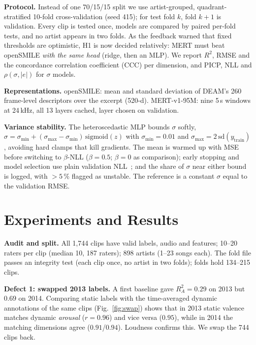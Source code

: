 \documentclass[conference]{IEEEtran}
\newcommand{\R}{R^2}
\begin{document}
\textbf{Protocol.} Instead of one 70/15/15 split we use artist-grouped,
quadrant-stratified 10-fold cross-validation (seed 415); for test fold $k$,
fold $k{+}1$ is validation. Every clip is tested once, models are compared by
paired per-fold tests, and no artist appears in two folds. As the feedback
warned that fixed thresholds are optimistic, H1 is now decided relatively:
MERT must beat openSMILE \emph{with the same head} (ridge, then an MLP). We
report $\R$, RMSE and the concordance correlation coefficient (CCC) per
dimension, and PICP, NLL and $\rho(\sigma,|e|)$ for $\sigma$ models.

\textbf{Representations.} openSMILE: mean and standard deviation of DEAM's 260
frame-level descriptors over the excerpt (520-d). MERT-v1-95M: nine 5\,s
windows at 24\,kHz, all 13 layers cached, layer chosen on validation.

\textbf{Variance stability.} The heteroscedastic MLP bounds $\sigma$ softly,
$\sigma=\sigma_{\min}+(\sigma_{\max}-\sigma_{\min})\,\mathrm{sigmoid}(z)$ with
$\sigma_{\min}=0.01$ and $\sigma_{\max}=2\,\mathrm{sd}(y_{\text{train}})$,
avoiding hard clamps that kill gradients. The mean is warmed up with MSE before
switching to $\beta$-NLL ($\beta=0.5$; $\beta=0$ as comparison); early stopping
and model selection use plain validation NLL~\cite{seitzer2022}; and the share
of $\sigma$ near either bound is logged, with $>5\,\%$ flagged as unstable.
The reference is a constant $\sigma$ equal to the validation RMSE.

\section{Experiments and Results}
\textbf{Audit and split.} All 1{,}744 clips have valid labels, audio and
features; 10--20 raters per clip (median 10, 187 raters); 898 artists (1--23
songs each). The fold file passes an integrity test (each clip once, no artist
in two folds); folds hold 134--215 clips.

\textbf{Defect 1: swapped 2013 labels.} A first baseline gave $\R_A=0.29$ on
2013 but $0.69$ on 2014. Comparing static labels with the time-averaged dynamic
annotations of the same clips (Fig.~\ref{fig:swap}) shows that in 2013 static
valence matches dynamic \emph{arousal} ($r=0.96$) and vice versa ($0.95$),
while in 2014 the matching dimensions agree ($0.91$/$0.94$). Loudness confirms
this. We swap the 744 clips back.
\end{document}
